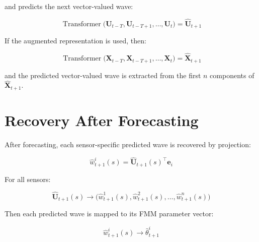 \documentclass[a4paper]{article}
\newcommand{\Transformer}{\operatorname{Transformer}}
\begin{document}
        and predicts the next vector-valued wave:
        
        \begin{equation}
            \Transformer
            \bigl(
            \mathbf{U}_{t-T},
            \mathbf{U}_{t-T+1},
            \ldots,
            \mathbf{U}_{t}
            \bigr)
            =
            \hat{\mathbf{U}}_{t+1}
        \end{equation}
        
        If the augmented representation is used, then:
        
        \begin{equation}
            \Transformer
            \bigl(
            \mathbf{X}_{t-T},
            \mathbf{X}_{t-T+1},
            \ldots,
            \mathbf{X}_{t}
            \bigr)
            =
            \hat{\mathbf{X}}_{t+1}
        \end{equation}
        
        and the predicted vector-valued wave is extracted from the first \(n\) components of \(\hat{\mathbf{X}}_{t+1}\).
    
    
    \section{Recovery After Forecasting}
        
        After forecasting, each sensor-specific predicted wave is recovered by projection:
        
        \begin{equation}
            \hat{w}_{t+1}^i(s)
            =
            \hat{\mathbf{U}}_{t+1}(s)^{\top}
            \mathbf{e}_i
        \end{equation}
        
        For all sensors:
        
        \begin{equation}
            \hat{\mathbf{U}}_{t+1}(s)
            \longrightarrow
            \bigl(
            \hat{w}_{t+1}^1(s),
            \hat{w}_{t+1}^2(s),
            \ldots,
            \hat{w}_{t+1}^n(s)
            \bigr)
        \end{equation}
        
        Then each predicted wave is mapped to its FMM parameter vector:
        
        \begin{equation}
            \hat{w}_{t+1}^i(s)
            \longrightarrow
            \hat{\theta}_{t+1}^i
        \end{equation}
        
\end{document}
